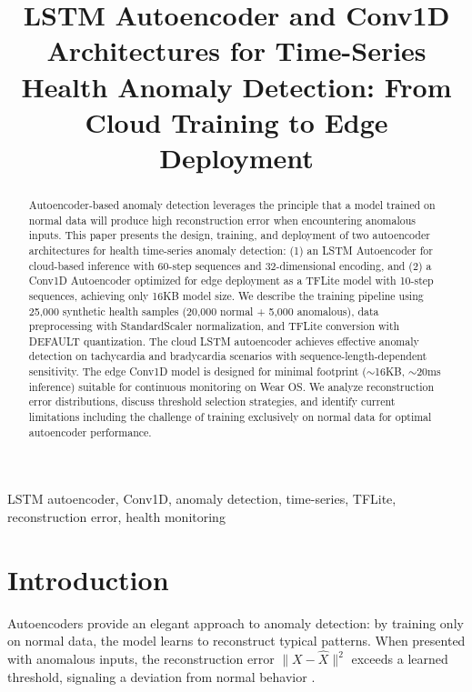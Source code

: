 \documentclass[conference]{IEEEtran}
\begin{document}
\title{LSTM Autoencoder and Conv1D Architectures for Time-Series Health Anomaly Detection: From Cloud Training to Edge Deployment}

\author{
}

\maketitle

\begin{abstract}
Autoencoder-based anomaly detection leverages the principle that a model trained on normal data will produce high reconstruction error when encountering anomalous inputs. This paper presents the design, training, and deployment of two autoencoder architectures for health time-series anomaly detection: (1) an LSTM Autoencoder for cloud-based inference with 60-step sequences and 32-dimensional encoding, and (2) a Conv1D Autoencoder optimized for edge deployment as a TFLite model with 10-step sequences, achieving only 16KB model size. We describe the training pipeline using 25,000 synthetic health samples (20,000 normal + 5,000 anomalous), data preprocessing with StandardScaler normalization, and TFLite conversion with DEFAULT quantization. The cloud LSTM autoencoder achieves effective anomaly detection on tachycardia and bradycardia scenarios with sequence-length-dependent sensitivity. The edge Conv1D model is designed for minimal footprint ($\sim$16KB, $\sim$20ms inference) suitable for continuous monitoring on Wear OS. We analyze reconstruction error distributions, discuss threshold selection strategies, and identify current limitations including the challenge of training exclusively on normal data for optimal autoencoder performance.
\end{abstract}

\begin{IEEEkeywords}
LSTM autoencoder, Conv1D, anomaly detection, time-series, TFLite, reconstruction error, health monitoring
\end{IEEEkeywords}

\section{Introduction}
Autoencoders provide an elegant approach to anomaly detection: by training only on normal data, the model learns to reconstruct typical patterns. When presented with anomalous inputs, the reconstruction error $\|X - \hat{X}\|^2$ exceeds a learned threshold, signaling a deviation from normal behavior \cite{ae_anomaly}.
\end{document}
